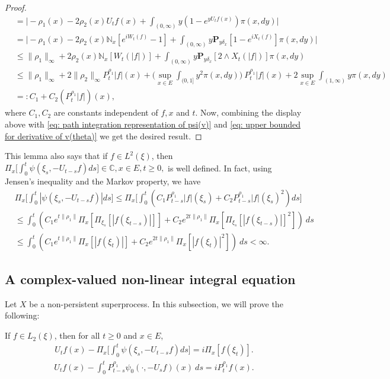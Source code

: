 \documentclass[EJP]{ejpecp} %
\begin{document}
\begin{proof}
\begin{align}
    & = \Big| -\rho_1(x)- 2\rho_2(x) U_tf(x)+ \int_{(0,\infty)} y (1- e^{y U_tf(x)} ) \pi(x,dy)\Big| \\
    & = \Big| - \rho_1(x)- 2\rho_2(x)\mathbb N_x[e^{i W_t(f)} - 1]  + \int_{(0,\infty)} y \mathbf P_{y \delta_x}[1-e^{i X_t(f)}] \pi(x,dy) \Big| \\
    & \leq \|\rho_1\|_\infty + 2\rho_2(x)\mathbb N_x[W_t(|f|)]+ \int_{(0,\infty)} y\mathbf P_{y\delta_x}[2\wedge X_t(|f|)] \pi(x,dy) \\
    & \leq \|\rho_1\|_\infty + 2\|\rho_2\|_\infty P^{\rho_1}_t |f|(x) + \Big(\sup_{x\in E}\int_{(0,1]}y^2 \pi(x,dy)\Big)~P^{\rho_1}_t |f|(x) + 2\sup_{x\in E}\int_{(1,\infty)} y \pi(x,dy) \\
    & =: C_1 + C_2(P^{\rho_1}_t |f|)(x), \label{eq: upper bound of psi'(v)}
  \end{align}
where $C_1, C_2$ are constants independent of $f,x$ and $t$.
  Now, combining the display above with \eqref{eq: path integration representation of psi(v)} and \eqref{eq: upper bounded for derivative of v(theta)} we get the desired result.
\end{proof}

This lemma also says that if $f\in L^2(\xi)$, then
$
  \Pi_x\Big[\int_0^t \psi(\xi_s,- U_{t-s}f)ds\Big]
  \in \mathbb C,
 x\in E, t\geq 0,$
is well defined.
In fact, using Jensen's inequality and the Markov property, we have
\begin{align}
  \label{eq: domination of psi(v)}
  & \Pi_x\Big[\int_0^t |\psi (\xi_s,-U_{t-s}f )|ds\Big]
  \leq \Pi_x\Big[\int_0^t (C_1 P_{t-s}^{\rho_1}|f|(\xi_s)+C_2 P_{t-s}^{\rho_1}|f|(\xi_s)^2 )ds\Big] \\
  & \leq \int_0^t (C_1 e^{t\|\rho_1\|}\Pi_x [ \Pi_{\xi_s}[|f(\xi_{t-s})|] ]+C_2 e^{2t\|\rho_1\|}\Pi_x [ \Pi_{\xi_s}[|f (\xi_{t-s})|]^2 ] )~ds \\
  & \leq \int_0^t (C_1 e^{t\|\rho_1\|}\Pi_x [ |f(\xi_{t})|]+C_2e^{2t\|\rho_1\|}\Pi_x [ |f (\xi_{t})|^2 ])~ds < \infty.
\end{align}

\subsection{A complex-valued non-linear integral equation}
Let $X$ be a non-persistent superprocess.
In this subsection, we will prove the following:

\begin{proposition}
  \label{prop: complex FKPP-equation}
  If $f\in L_2(\xi)$,  then for all $t\geq 0$ and $x\in E$,
\begin{align}
  \label{eq: complex FKPP-equation}
  U_tf(x) - \Pi_x \Big[\int_0^t \psi (\xi_s, - U_{t-s}f ) ds \Big]
  = i \Pi_x [f(\xi_t)].
\end{align}
\begin{align}
  \label{eq: complex FKPP-equation with FK-transform}
  U_tf(x) -  \int_0^t P_{t-s}^{\rho_1} \psi_0(\cdot,-U_sf) (x)~ds
  = iP_t^{\rho_1} f(x).
\end{align}
\end{proposition}
\end{document}
